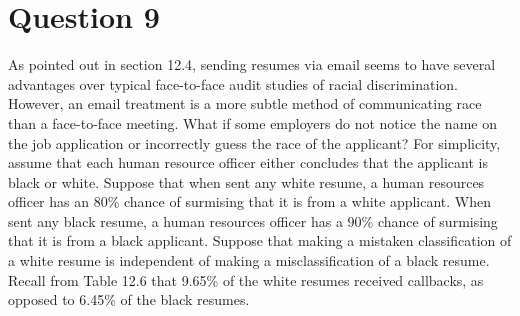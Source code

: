 \documentclass[11pt,notitlepage]{article}\usepackage[]{graphicx}\usepackage[]{color}
\begin{document}
\section*{Question 9}
As pointed out in section 12.4, sending resumes via email seems to have several advantages over typical face-to-face audit studies of racial discrimination. However, an email treatment is a more subtle method of communicating race than a face-to-face meeting. What if some employers do not notice the name on the job application or incorrectly guess the race of the applicant? For simplicity, assume that each human resource officer either concludes that the applicant is black or white. Suppose that when sent any white resume, a human resources officer has an 80\% chance of surmising that it is from a white applicant. When sent any black resume, a human resources officer has a 90\% chance of surmising that it is from a black applicant. Suppose that making a mistaken classification of a white resume is independent of making a misclassification of a black resume. Recall from Table 12.6 that 9.65\% of the white resumes received callbacks, as opposed to 6.45\% of the black resumes.
\end{document}
